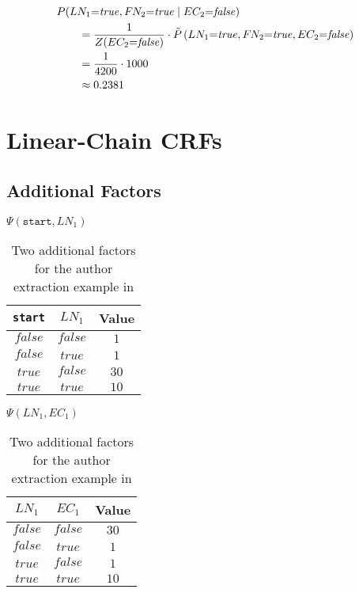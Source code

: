 \begin{subequations}
\begin{equation*}
\begin{split}
  &P(LN_1{=}\mathit{true},F\hspace{-0.07em} N_2{=}\mathit{true}\mid EC_2{=}\mathit{false})\\
  &\hspace{2em}=\frac{1}{Z(EC_2{=}\mathit{false})}\cdot\tilde{P}\left(LN_1{=}\mathit{true},F\hspace{-0.07em} N_2{=}\mathit{true},EC_2{=}\mathit{false}\right)\\
  &\hspace{2em}=\frac{1}{4200}\cdot1000\\
  &\hspace{2em}\approx0.2381\\
\end{split}
\end{equation*}
\end{subequations}
\section{Linear-Chain CRFs}\label{app:sec-linear-chain-crfs}
\subsection{Additional Factors}\label{app:subsec-lccrf-additional-factors}

\begin{table}[H]
\begin{minipage}{0.5\linewidth}
\centering
$\Psi(\texttt{start},LN_1)$\par
\smallskip
\begin{tabular}{c c c}
 \toprule
 \texttt{start} & $LN_1$ & Value \\
 \midrule
 $\mathit{false}$ & $\mathit{false}$ & $1$ \\
 $\mathit{false}$ & $\mathit{true}$ & $1$ \\
 $\mathit{true}$ & $\mathit{false}$ & $30$ \\
 $\mathit{true}$ & $\mathit{true}$ & $10$ \\
 \bottomrule
\end{tabular}
\end{minipage}
\hfill
\begin{minipage}{0.5\linewidth}
\centering
$\Psi(LN_1,EC_1)$\par
\smallskip
\begin{tabular}{c c c}
 \toprule
 $LN_1$ & $EC_1$ & Value \\
 \midrule
 $\mathit{false}$ & $\mathit{false}$ & $30$ \\
 $\mathit{false}$ & $\mathit{true}$ & $1$ \\
 $\mathit{true}$ & $\mathit{false}$ & $1$ \\
 $\mathit{true}$ & $\mathit{true}$ & $10$ \\
 \bottomrule
\end{tabular}
\end{minipage}
\caption{Two additional factors for the author extraction example in }
\label{tab:example-linear-chain-crf-factors}
\end{table}

